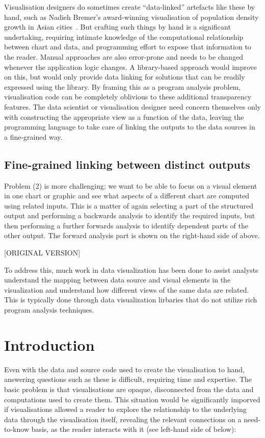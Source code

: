 Visualisation designers do sometimes create ``data-linked'' artefacts like these by hand, such as Nadieh Bremer's award-winning visualisation of population density growth in Asian cities~\cite{bremer15}. But crafting such things by hand is a significant undertaking, requiring intimate knowledge of the computational relationship between chart and data, and programming effort to expose that information to the reader. Manual approaches are also error-prone and needs to be changed whenever the application logic changes. A library-based approach would improve on this, but would only provide data linking for solutions that can be readily expressed using the library. By framing this as a program analysis problem, visualisation code can be completely oblivious to these additional transparency features. The data scientist or visualisation designer need concern themselves only with constructing the appropriate view as a function of the data, leaving the programming language to take care of linking the outputs to the data sources in a fine-grained way.

\subsection{Fine-grained linking between distinct outputs}

Problem (2) is more challenging; we want to be able to focus on a visual element in one chart or graphic and see what aspects of a different chart are computed using related inputs. This is a matter of again selecting a part of the structured output and performing a backwards analysis to identify the required inputs, but then performing a further forwards analysis to identify dependent parts of the other output. The forward analysis part is shown on the right-hand side of  above.

[ORIGINAL VERSION]

To address this, much work in data visualization has been done to assist analysts understand the mapping between data source and visual elements in the visualization and understand how different views of the same data are related. This is typically done through data visualization lirbaries that do not utilize rich program analysis techniques.

\section{Introduction}

\noindent Even with the data and source code used to create the visualisation to hand, answering questions such as these is difficult, requiring time and expertise. The basic problem is that visualisations are opaque, disconnected from the data and computations used to create them. This situation would be significantly imporved if visualisations allowed a reader to explore the relationship to the underlying data through the visualisation itself, revealing the relevant connections on a need-to-know basis, as the reader interacts with it (see left-hand side of  below):

